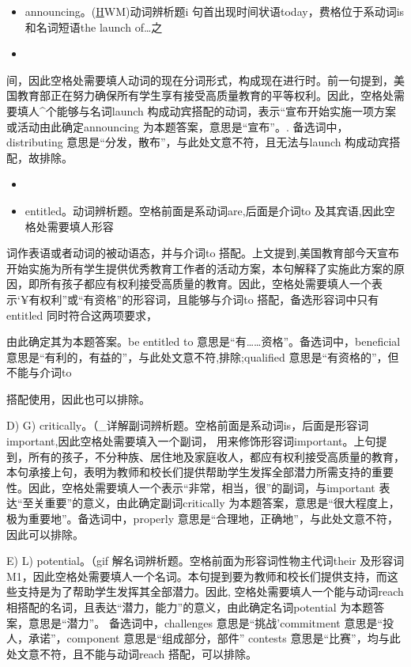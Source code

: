 \documentclass[UTF8,11pt]{ctexart}
\begin{document}
\begin{itemize}[leftmargin=2em,itemsep=.2em,topsep=.4em]\item[A.] announcing。(\uline{H}WM)动词辨析题i 句首出现时间状语today，费格位于系动词is 和名词短语the launch of…之
\item[B.] 
\end{itemize}

间，因此空格处需要填人动词的现在分词形式，构成现在进行时。前一句提到，美国教育部正在努力确保所有学生享有接受高质量教育的平等权利。因此，空格处需要填人\textasciicircum{}个能够与名词launch 构成动宾搭配的动词，表示“宣布开始实施一项方案或活动由此确定announcing 为本题答案，意思是“宣布”。. 备选词中，distributing 意思是“分发，散布”，与此处文意不符，且无法与launch 构成动宾搭配，故排除。


\begin{itemize}[leftmargin=2em,itemsep=.2em,topsep=.4em]\item[C.] 
\item[K.] entitled。动词辨析题。空格前面是系动词are,后面是介词to 及其宾语,因此空格处需要填人形容
\end{itemize}

词作表语或者动词的被动语态，并与介词to 搭配。上文提到,美国教育部今天宣布开始实施为所有学生提供优秀教育工作者的活动方案，本句解释了实施此方案的原因，即所有孩子都应有权利接受高质量的教育。因此，空格处需要填人一个表示‘¥有权利”或“有资格”的形容词，且能够与介词to 搭配，备选形容词中只有entitled 同时符合这两项要求，


由此确定其为本题答案。be entitled to 意思是“有……资格”。备选词中，beneficial 意思是“有利的，有益的”，与此处文意不符,排除;qualified 意思是“有资格的”，但不能与介词to


搭配使用，因此也可以排除。


D) G) critically。（\_详解副词辨析题。空格前面是系动词is，后面是形容词important,因此空格处需要填入一个副词， 用来修饰形容词important。上句提到，所有的孩子，不分种族、居住地及家庭收人，都应有权利接受高质量的教育， 本句承接上句，表明为教师和校长们提供帮助学生发挥全部潜力所需支持的重要性。因此，空格处需要填人一个表示“非常，相当，很”的副词，与important 表达“至关重要”的意义，由此确定副词critically 为本题答案，意思是“很大程度上，极为重要地”。备选词中，properly 意思是“合理地，正确地”，与此处文意不符，因此可以排除。


E) L) potential。（gif 解名词辨析题。空格前面为形容词性物主代词their 及形容词M1，因此空格处需要填人一个名词。本句提到要为教师和校长们提供支持，而这些支持是为了帮助学生发挥其全部潜力。因此, 空格处需要填人一个能与动词reach 相搭配的名词，且表达“潜力，能力”的意义，由此确定名词potential 为本题答案，意思是“潜力”。 备选词中，challenges 意思是“挑战'commitment 意思是“投人，承诺”，component 意思是“组成部分，部件” contests 意思是“比赛”，均与此处文意不符，且不能与动词reach 搭配，可以排除。
\end{document}
